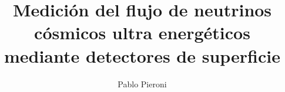 \documentclass[a4paper,12pt]{book}
\title{Medición del flujo de neutrinos cósmicos ultra energéticos mediante detectores de superficie}
\author{Pablo Pieroni}
\begin{document}
\renewcommand{\listtablename}{Índice de tablas}
\renewcommand{\tablename}{Tabla} 




\newpage
\thispagestyle{empty}
\mbox{}



\maketitle
\tableofcontents



% 
% 
% 
% 
% 
% 
% 
% 
% 
% 
% 
% 
% 
% 
% 
\end{document}
